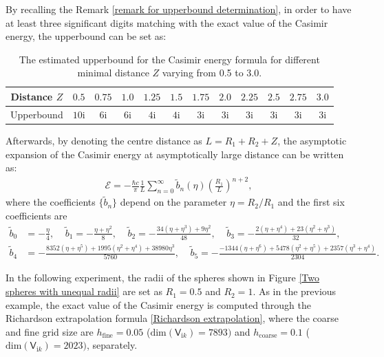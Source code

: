 By recalling the Remark \ref{remark for upperbound determination}, in order to have at least three significant digits matching with the exact value of the Casimir
energy, the upperbound can be set as:
\begin{table}[H]
    \centering
    \begin{tabular}{ |c|c|c|c|c|c|c|c|c|c|c|c| }
        \hline
        Distance $Z$ & $ 0.5$ & $ 0.75$  & $ 1.0$ & $1.25$ & $ 1.5$ & $1.75$  & $2.0$ & $2.25$ & $ 2.5$ & $ 2.75$  & $3.0$ \\\hline
        Upperbound & $10\mathrm{i}$ & $6\mathrm{i}$ & $6\mathrm{i}$ & $4\mathrm{i}$ & $4\mathrm{i}$ & $3\mathrm{i}$ & $3\mathrm{i}$ & $3\mathrm{i}$ & $3\mathrm{i}$ & $3\mathrm{i}$ & $3\mathrm{i}$ \\\hline
       \end{tabular}
       \caption{\label{Unqual: distance and upperbound error tolerance} The estimated upperbound for the Casimir energy formula for different minimal distance $Z$ varying from 
       0.5 to 3.0.}
\end{table}

Afterwards, by denoting the centre distance as
$L = R_{1} + R_{2} + Z$, the asymptotic expansion of the Casimir energy at asymptotically large distance can be written as:
\begin{align}\label{Asymptotic unequal radii}
    \mathcal{E} = -\frac{\hbar c}{\pi}\frac{1}{L}\sum_{n=0}^{\infty}\tilde{b}_{n}(\eta)\left(\frac{R_{1}}{L}\right)^{n+2},
\end{align}
where the coefficients $\{\tilde{b}_{n}\}$ depend on the parameter $\eta = R_{2}/R_{1}$ and the first six coefficients are
\begin{align*}
    \tilde{b}_{0} &= -\frac{\eta}{4}, \ \ \ \ \ \tilde{b}_{1} = -\frac{\eta + \eta^{2}}{8}, \ \ \ \ \  \tilde{b}_{2} = -\frac{34(\eta+\eta^{3})+ 9\eta^{2}}{48}, \ \ \ \ \ \tilde{b}_{3} = -\frac{2(\eta+\eta^{4}) + 23(\eta^{2} + \eta^{3})}{32}, \\ 
    \tilde{b}_{4} &= -\frac{8352(\eta + \eta^{5})+ 1995(\eta^{2} + \eta^{4}) + 38980\eta^{3}}{5760}, \ \ \ \ \ \tilde{b}_{5} = -\frac{-1344(\eta+\eta^{6}) + 5478(\eta^{2} + \eta^{5})+2357(\eta^{3} + \eta^{4})}{2304}.
\end{align*}

In the following experiment, the radii of the spheres shown in Figure \ref{Two spheres with unequal radii} are set as $R_{1} = 0.5$ and $ R_{2} = 1$. 
As in the previous example, the exact value of the Casimir energy is computed through the Richardson extrapolation formula \eqref{Richardson extrapolation}, 
where the coarse and fine grid size are $h_{\text{fine}} = 0.05$ ($\text{dim}(\mathsf{V}_{\mathrm{i}k}) = 7893)$ and 
$h_{\text{coarse}} = 0.1$ ($\text{dim}(\mathsf{V}_{\mathrm{i}k}) = 2023)$, separately. 


